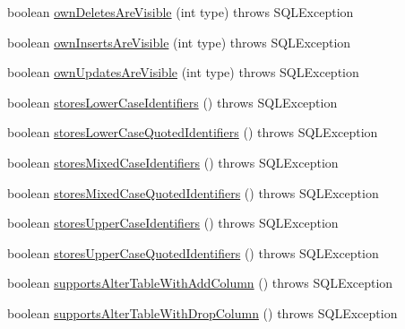 \begin{DoxyCompactItemize}
\item 
boolean \mbox{\hyperlink{classcom_1_1mysql_1_1cj_1_1jdbc_1_1_database_meta_data_a15c484885887bce87e58e9d72cfec7dc}{own\+Deletes\+Are\+Visible}} (int type)  throws S\+Q\+L\+Exception 
\item 
boolean \mbox{\hyperlink{classcom_1_1mysql_1_1cj_1_1jdbc_1_1_database_meta_data_a4bef4c1a76186b8ad13e215477aa4089}{own\+Inserts\+Are\+Visible}} (int type)  throws S\+Q\+L\+Exception 
\item 
boolean \mbox{\hyperlink{classcom_1_1mysql_1_1cj_1_1jdbc_1_1_database_meta_data_ac71adb774c60d7558f9183001602b895}{own\+Updates\+Are\+Visible}} (int type)  throws S\+Q\+L\+Exception 
\item 
boolean \mbox{\hyperlink{classcom_1_1mysql_1_1cj_1_1jdbc_1_1_database_meta_data_a2acfc886d13080ef24bf330ac054b2d7}{stores\+Lower\+Case\+Identifiers}} ()  throws S\+Q\+L\+Exception 
\item 
boolean \mbox{\hyperlink{classcom_1_1mysql_1_1cj_1_1jdbc_1_1_database_meta_data_a484be93eb5a6791992652b8d954afa78}{stores\+Lower\+Case\+Quoted\+Identifiers}} ()  throws S\+Q\+L\+Exception 
\item 
boolean \mbox{\hyperlink{classcom_1_1mysql_1_1cj_1_1jdbc_1_1_database_meta_data_a742819e579d84cb1ade3dcadb16471ba}{stores\+Mixed\+Case\+Identifiers}} ()  throws S\+Q\+L\+Exception 
\item 
boolean \mbox{\hyperlink{classcom_1_1mysql_1_1cj_1_1jdbc_1_1_database_meta_data_ad2dec78819a06dcdaa0d9422c3a1714b}{stores\+Mixed\+Case\+Quoted\+Identifiers}} ()  throws S\+Q\+L\+Exception 
\item 
boolean \mbox{\hyperlink{classcom_1_1mysql_1_1cj_1_1jdbc_1_1_database_meta_data_a59d4e06d27f9b3fa1258f31c3727b806}{stores\+Upper\+Case\+Identifiers}} ()  throws S\+Q\+L\+Exception 
\item 
boolean \mbox{\hyperlink{classcom_1_1mysql_1_1cj_1_1jdbc_1_1_database_meta_data_a1fddd0ed7b45c4fd038d3d2177dbdfb4}{stores\+Upper\+Case\+Quoted\+Identifiers}} ()  throws S\+Q\+L\+Exception 
\item 
boolean \mbox{\hyperlink{classcom_1_1mysql_1_1cj_1_1jdbc_1_1_database_meta_data_a94604413083173d8d191bd89e6383594}{supports\+Alter\+Table\+With\+Add\+Column}} ()  throws S\+Q\+L\+Exception 
\item 
boolean \mbox{\hyperlink{classcom_1_1mysql_1_1cj_1_1jdbc_1_1_database_meta_data_ab6e5acfa92dcb892a19cae3f54261461}{supports\+Alter\+Table\+With\+Drop\+Column}} ()  throws S\+Q\+L\+Exception 
\item 

\end{DoxyCompactItemize}
